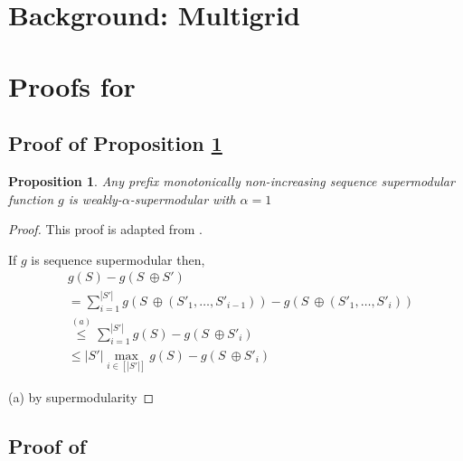 \documentclass{article} %
\newtheorem{proposition}[theorem]{Proposition}
\begin{document}



\appendix
\section{Background: Multigrid} \label{sec:multigrid}

\section{Proofs for } \label{sec:proofgreedy}

\subsection{Proof of Proposition \ref{th:alpha=1}} \label{sec:proofalpha=1}

\begin{proposition} \label{th:alpha=1}
    Any prefix monotonically non-increasing sequence supermodular function $g$ is weakly-$\alpha$-supermodular with $\alpha = 1$
\end{proposition}

\begin{proof}

This proof is adapted from \citet{liberty2017greedy}.

If $g$ is sequence supermodular then,
\begin{align*}
    &g(S) - g(S \ \oplus S' ) \\
    &= \sum_{i = 1}^{|S'|} g(S \ \oplus \left(S'_1, \dots, S'_{i - 1}\right)) - g(S \ \oplus \left(S'_1, \dots, S'_{i}\right)) \\
    &\overset{(a)}{\leq} \sum_{i = 1}^{|S'|} g(S) - g(S \ \oplus  S'_{i}) \\
    &\leq |S'|\max_{i \in [|S'|]} g(S) - g(S \ \oplus  S'_{i})
\end{align*}

(a) by supermodularity


\end{proof}

\subsection{Proof of } \label{sec:proofsuboptgreedy}
\end{document}
